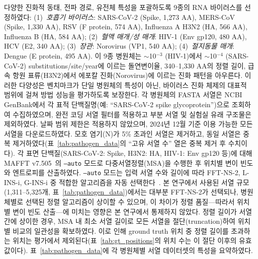 다양한 진화적 동태, 전파 경로, 유전체 특성을 포괄하도록 9종의 RNA 바이러스를 선정하였다:
(1)~\textit{호흡기 바이러스}: SARS-CoV-2 (Spike, 1,273 AA), MERS-CoV (Spike, 1,330 AA), RSV (F protein, 574 AA), Influenza A H3N2 (HA, 566 AA), Influenza B (HA, 584 AA);
(2)~\textit{혈액 매개/성 매개}: HIV-1 (Env gp120, 480 AA), HCV (E2, 340 AA);
(3)~\textit{장관}: Norovirus (VP1, 540 AA);
(4)~\textit{절지동물 매개}: Dengue (E protein, 495 AA).
이 9종 병원체는 $\sim$10$^{-3}$ (HIV-1)에서 $\sim$10$^{-4}$ (SARS-CoV-2) substitutions/site/year에 이르는 돌연변이율, 340--1,330 AA의 정렬 길이, 급속 항원 표류(H3N2)에서 에포칼 진화(Norovirus)에 이르는 진화 패턴을 아우른다.
이러한 다양성은 벤치마크가 단일 병원체의 특성이 아닌, 바이러스 진화 체제의 대표적 범위에 걸쳐 방법 성능을 평가하도록 보장한다.
각 병원체의 FASTA 서열은 NCBI GenBank에서 각 표적 단백질명(예: ``SARS-CoV-2 spike glycoprotein'')으로 조회하여 수집하였으며, 완전 코딩 서열 필터를 적용하고 부분 서열 및 실험실 유래 구조물은 제외하였다. 날짜 범위 제한은 적용하지 않았으며, 2024년 12월 기준 이용 가능한 모든 서열을 다운로드하였다. 모호 염기(N)가 5\% 초과인 서열은 제거하고, 동일 서열은 중복 제거하였다(표~\ref{tab:pathogen_data}의 ``고유 서열 수'' 열은 중복 제거 후 수치이다). 각 표면 단백질(SARS-CoV-2: Spike, H3N2: HA, HIV-1: Env gp120 등)에 대해 MAFFT v7.505~\cite{katoh2013mafft}의 \texttt{--auto} 모드로 다중서열정렬(MSA)을 수행한 후 위치별 변이 빈도와 엔트로피를 산출하였다.
\texttt{--auto} 모드는 입력 서열 수와 길이에 따라 FFT-NS-2, L-INS-i, G-INS-i 중 적합한 알고리즘을 자동 선택한다~\cite{katoh2013mafft}.
본 연구에서 사용된 서열 규모(1,311--5,325개, 표~\ref{tab:pathogen_data})에서는 대부분 FFT-NS-2가 선택되나, 병원체별로 선택된 정렬 알고리즘이 상이할 수 있으며, 이 차이가 정렬 품질---따라서 위치별 변이 빈도 산출---에 미치는 영향은 본 연구에서 통제하지 않았다.
정렬 길이가 서열 간에 상이한 경우, MSA 내 최소 서열 길이로 모든 서열을 절단(truncation)하여 위치별 비교의 일관성을 확보하였다.
이로 인해 ground truth 위치 중 정렬 길이를 초과하는 위치는 평가에서 제외된다(표~\ref{tab:gt_positions}의 위치 수는 이 절단 이후의 유효 값이다).
표~\ref{tab:pathogen_data}에 각 병원체별 서열 데이터셋의 특성을 요약하였다.

